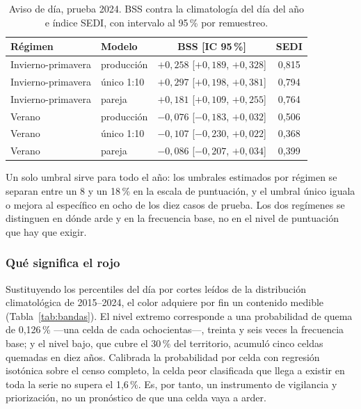 \documentclass[10pt,a4paper]{article}
\begin{document}
\begin{table}[htbp]\centering\footnotesize
\caption{Aviso de día, prueba 2024. BSS contra la climatología del día del año e
índice SEDI, con intervalo al 95\,\% por remuestreo.}
\label{tab:si}
\begin{tabular}{llcc}
\toprule
Régimen & Modelo & BSS [IC 95\,\%] & SEDI \\
\midrule
Invierno-primavera & producción & $+0{,}258$ [$+0{,}189$, $+0{,}328$] & 0,815 \\
Invierno-primavera & único 1:10 & $+0{,}297$ [$+0{,}198$, $+0{,}381$] & 0,794 \\
Invierno-primavera & pareja     & $+0{,}181$ [$+0{,}109$, $+0{,}255$] & 0,764 \\
\midrule
Verano & producción & $-0{,}076$ [$-0{,}183$, $+0{,}032$] & 0,506 \\
Verano & único 1:10 & $-0{,}107$ [$-0{,}230$, $+0{,}022$] & 0,368 \\
Verano & pareja     & $-0{,}086$ [$-0{,}207$, $+0{,}034$] & 0,399 \\
\bottomrule
\end{tabular}
\end{table}

Un solo umbral sirve para todo el año: los umbrales estimados por régimen se
separan entre un 8 y un 18\,\% en la escala de puntuación, y el umbral único
iguala o mejora al específico en ocho de los diez casos de prueba. Los dos
regímenes se distinguen en dónde arde y en la frecuencia base, no en el nivel de
puntuación que hay que exigir.

\subsubsection*{Qué significa el rojo}

Sustituyendo los percentiles del día por cortes leídos de la distribución
climatológica de 2015--2024, el color adquiere por fin un contenido medible
(Tabla~\ref{tab:bandas}). El nivel extremo corresponde a una probabilidad de
quema de 0,126\,\% ---una celda de cada ochocientas---, treinta y seis veces la
frecuencia base; y el nivel bajo, que cubre el 30\,\% del territorio, acumuló
cinco celdas quemadas en diez años. Calibrada la probabilidad por celda con
regresión isotónica sobre el censo completo, la celda peor clasificada que llega
a existir en toda la serie no supera el 1,6\,\%. Es, por tanto, un instrumento de
vigilancia y priorización, no un pronóstico de que una celda vaya a arder.
\end{document}
